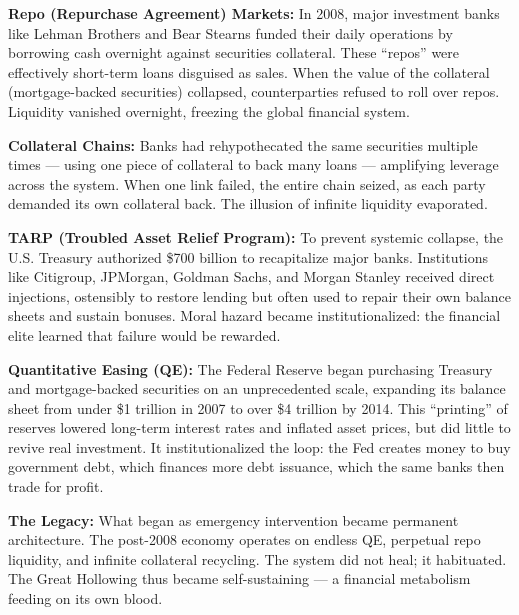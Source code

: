\documentclass[11pt,twoside]{book}
\begin{document}
\begin{tcolorbox}[colback=gray!6!white,colframe=black!25!white,title=\textbf{Appendix: 2008 Crisis Mechanics — Repo, TARP, QE, and Collateral Chains},fonttitle=\bfseries]
\small
\textbf{Repo (Repurchase Agreement) Markets:}  
In 2008, major investment banks like Lehman Brothers and Bear Stearns funded their daily operations by borrowing cash overnight against securities collateral.  
These “repos” were effectively short-term loans disguised as sales.  
When the value of the collateral (mortgage-backed securities) collapsed, counterparties refused to roll over repos.  
Liquidity vanished overnight, freezing the global financial system.

\textbf{Collateral Chains:}  
Banks had rehypothecated the same securities multiple times — using one piece of collateral to back many loans — amplifying leverage across the system.  
When one link failed, the entire chain seized, as each party demanded its own collateral back.  
The illusion of infinite liquidity evaporated.

\textbf{TARP (Troubled Asset Relief Program):}  
To prevent systemic collapse, the U.S. Treasury authorized \$700 billion to recapitalize major banks.  
Institutions like Citigroup, JPMorgan, Goldman Sachs, and Morgan Stanley received direct injections, ostensibly to restore lending but often used to repair their own balance sheets and sustain bonuses.  
Moral hazard became institutionalized: the financial elite learned that failure would be rewarded.

\textbf{Quantitative Easing (QE):}  
The Federal Reserve began purchasing Treasury and mortgage-backed securities on an unprecedented scale, expanding its balance sheet from under \$1 trillion in 2007 to over \$4 trillion by 2014.  
This “printing” of reserves lowered long-term interest rates and inflated asset prices, but did little to revive real investment.  
It institutionalized the loop: the Fed creates money to buy government debt, which finances more debt issuance, which the same banks then trade for profit.

\textbf{The Legacy:}  
What began as emergency intervention became permanent architecture.  
The post-2008 economy operates on endless QE, perpetual repo liquidity, and infinite collateral recycling.  
The system did not heal; it habituated.  
The Great Hollowing thus became self-sustaining — a financial metabolism feeding on its own blood.
\end{tcolorbox}

% 
\end{document}
